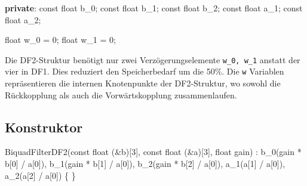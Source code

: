 \documentclass[
  ngerman,
  letterpaper,
  DIV=11]{scrreprt}
\newenvironment{Shaded}{\begin{snugshade}}{\end{snugshade}}
\newcommand{\AttributeTok}[1]{\textcolor[rgb]{0.40,0.45,0.13}{#1}}
\newcommand{\DataTypeTok}[1]{\textcolor[rgb]{0.68,0.00,0.00}{#1}}
\newcommand{\DecValTok}[1]{\textcolor[rgb]{0.68,0.00,0.00}{#1}}
\newcommand{\KeywordTok}[1]{\textcolor[rgb]{0.00,0.23,0.31}{\textbf{#1}}}
\newcommand{\NormalTok}[1]{\textcolor[rgb]{0.00,0.23,0.31}{#1}}
\newcommand{\OperatorTok}[1]{\textcolor[rgb]{0.37,0.37,0.37}{#1}}
\begin{document}
\begin{Shaded}
\begin{Highlighting}[]
\KeywordTok{private}\OperatorTok{:}
  \AttributeTok{const} \DataTypeTok{float}\NormalTok{ b\_0}\OperatorTok{;} 
  \AttributeTok{const} \DataTypeTok{float}\NormalTok{ b\_1}\OperatorTok{;}
  \AttributeTok{const} \DataTypeTok{float}\NormalTok{ b\_2}\OperatorTok{;}
  \AttributeTok{const} \DataTypeTok{float}\NormalTok{ a\_1}\OperatorTok{;}
  \AttributeTok{const} \DataTypeTok{float}\NormalTok{ a\_2}\OperatorTok{;}

  \DataTypeTok{float}\NormalTok{ w\_0 }\OperatorTok{=} \DecValTok{0}\OperatorTok{;}
  \DataTypeTok{float}\NormalTok{ w\_1 }\OperatorTok{=} \DecValTok{0}\OperatorTok{;}
\end{Highlighting}
\end{Shaded}

Die DF2-Struktur benötigt nur zwei Verzögerungselemente
\texttt{w\_0,\ w\_1} anstatt der vier in DF1. Dies reduziert den
Speicherbedarf um die 50\%. Die \texttt{w} Variablen repräsentieren die
internen Knotenpunkte der DF2-Struktur, wo sowohl die Rückkopplung als
auch die Vorwärtskopplung zusammenlaufen.

\subsection{Konstruktor}\label{konstruktor-1}

\begin{Shaded}
\begin{Highlighting}[]
\NormalTok{BiquadFilterDF2}\OperatorTok{(}\AttributeTok{const} \DataTypeTok{float} \OperatorTok{(\&}\NormalTok{b}\OperatorTok{)[}\DecValTok{3}\OperatorTok{],} \AttributeTok{const} \DataTypeTok{float} \OperatorTok{(\&}\NormalTok{a}\OperatorTok{)[}\DecValTok{3}\OperatorTok{],} \DataTypeTok{float}\NormalTok{ gain}\OperatorTok{)}  
    \OperatorTok{:}\NormalTok{ b\_0}\OperatorTok{(}\NormalTok{gain }\OperatorTok{*}\NormalTok{ b}\OperatorTok{[}\DecValTok{0}\OperatorTok{]} \OperatorTok{/}\NormalTok{ a}\OperatorTok{[}\DecValTok{0}\OperatorTok{]),}
\NormalTok{      b\_1}\OperatorTok{(}\NormalTok{gain }\OperatorTok{*}\NormalTok{ b}\OperatorTok{[}\DecValTok{1}\OperatorTok{]} \OperatorTok{/}\NormalTok{ a}\OperatorTok{[}\DecValTok{0}\OperatorTok{]),}
\NormalTok{      b\_2}\OperatorTok{(}\NormalTok{gain }\OperatorTok{*}\NormalTok{ b}\OperatorTok{[}\DecValTok{2}\OperatorTok{]} \OperatorTok{/}\NormalTok{ a}\OperatorTok{[}\DecValTok{0}\OperatorTok{]),}
\NormalTok{      a\_1}\OperatorTok{(}\NormalTok{a}\OperatorTok{[}\DecValTok{1}\OperatorTok{]} \OperatorTok{/}\NormalTok{ a}\OperatorTok{[}\DecValTok{0}\OperatorTok{]),}
\NormalTok{      a\_2}\OperatorTok{(}\NormalTok{a}\OperatorTok{[}\DecValTok{2}\OperatorTok{]} \OperatorTok{/}\NormalTok{ a}\OperatorTok{[}\DecValTok{0}\OperatorTok{])} 
\OperatorTok{\{}
\OperatorTok{\}}
\end{Highlighting}
\end{Shaded}
\end{document}
